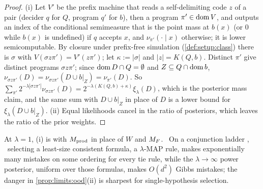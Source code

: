 \begin{proof}
(i) Let $V'$ be the prefix machine that reads a self-delimiting code $z$ of a pair (decider $q$ for $Q$, program $q'$ for $b$), then a program $\pi'\in\operatorname{dom} V$, and outputs an index of the conditional semimeasure that is the point mass at $b(x)$ (or $0$ while $b(x)$ is undefined) if $q$ accepts $x$, and $\nu_{\pi'}(\cdot\mid x)$ otherwise; it is lower semicomputable. By closure under prefix-free simulation (\cref{def:setup:class}) there is $\sigma$ with $V(\sigma z\pi')=V'(z\pi')$; let $\kappa:=|\sigma|$ and $|z|=K(Q,b)$. Distinct $\pi'$ give distinct programs $\sigma z\pi'$; since $\operatorname{dom} D\cap Q=\emptyset$ and $Z\subseteq Q\cap\operatorname{dom} b$, $\nu_{\sigma z\pi'}(D)=\nu_{\sigma z\pi'}(D\cup b|_Z)=\nu_{\pi'}(D)$. So $\sum_{\pi'}2^{-\lambda|\sigma z\pi'|}\nu_{\sigma z\pi'}(D)=2^{-\lambda(K(Q,b)+\kappa)}\xi_\lambda(D)$, which is the posterior mass claim, and the same sum with $D\cup b|_Z$ in place of $D$ is a lower bound for $\xi_\lambda(D\cup b|_Z)$. (ii) Equal likelihoods cancel in the ratio of posteriors, which leaves the ratio of the prior weights.
\end{proof}

At $\lambda=1$, (i) is \citet[Proposition~8.1(a)]{claudeSFI2026fundamentals} with $M_{\mathrm{prod}}$ in place of $W$ and $M_{F}$.%
\ On a conjunction ladder \citep[Theorem~9.10 and Remark~G.11]{claudeSFI2026fundamentals},%
\ selecting a least-size consistent formula, a $\lambda$-MAP rule, makes exponentially many mistakes on some ordering for every tie rule, while the $\lambda\to\infty$ power posterior, uniform over those formulas, makes $O(d^2)$ Gibbs mistakes; the danger in \cref{prop:limits:ood}(ii) is sharpest for single-hypothesis selection.
